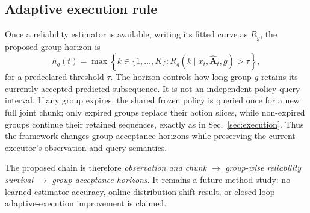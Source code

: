 \subsection{Adaptive execution rule}

Once a reliability estimator is available, writing its fitted curve as $R_g$,
the proposed group horizon is
\begin{equation}
h_g(t)=\max\left\{k\in\{1,\ldots,K\}:
R_g(k\mid x_t,\widehat{\mathbf A}_t,g)>\tau\right\},
\label{eq:adaptive_horizon}
\end{equation}
for a predeclared threshold $\tau$.  The horizon controls how long group $g$
retains its currently accepted predicted subsequence.  It is not an independent
policy-query interval.  If any group expires, the shared frozen policy is
queried once for a new full joint chunk; only expired groups replace their action
slices, while non-expired groups continue their retained sequences, exactly as
in Sec.~\ref{sec:execution}.  Thus the framework changes group acceptance
horizons while preserving the current executor's observation and query
semantics.

The proposed chain is therefore
\emph{observation and chunk} $\rightarrow$ \emph{group-wise reliability
survival} $\rightarrow$ \emph{group acceptance horizons}.  It remains a future
method study: no learned-estimator accuracy, online distribution-shift result,
or closed-loop adaptive-execution improvement is claimed.
